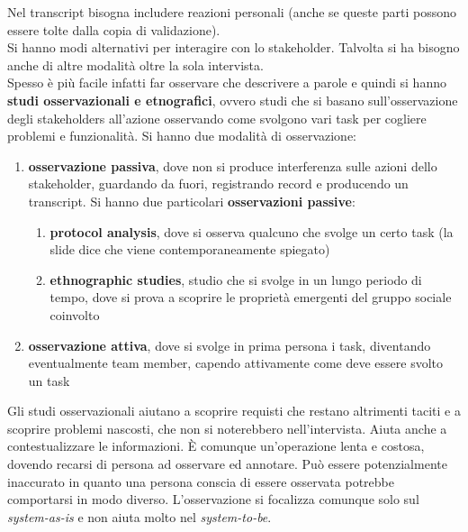 Nel transcript bisogna includere reazioni personali (anche se queste parti possono essere tolte dalla copia di validazione).\\
Si hanno modi alternativi per interagire con lo stakeholder. Talvolta si ha bisogno anche di altre modalità oltre la sola intervista.\\
Spesso è più facile infatti far osservare che descrivere a parole e quindi si hanno \textbf{studi osservazionali e etnografici}, ovvero studi che si basano sull'osservazione degli stakeholders all'azione osservando come svolgono vari task per cogliere problemi e funzionalità. Si hanno due modalità di osservazione:
\begin{enumerate}
  \item \textbf{osservazione passiva}, dove non si produce interferenza sulle azioni dello stakeholder, guardando da fuori, registrando record e producendo un transcript. Si hanno due particolari \textbf{osservazioni passive}:
      \begin{enumerate}
        \item \textbf{protocol analysis}, dove si osserva qualcuno che svolge un certo task (la slide dice che viene contemporaneamente spiegato)
        \item \textbf{ethnographic studies}, studio che si svolge in un lungo periodo di tempo, dove si prova a scoprire le proprietà emergenti del gruppo sociale coinvolto
      \end{enumerate}
  \item \textbf{osservazione attiva}, dove si svolge in prima persona i task, diventando eventualmente team member, capendo attivamente come deve essere svolto un task
\end{enumerate}
Gli studi osservazionali aiutano a scoprire requisti che restano altrimenti taciti e a scoprire problemi nascosti, che non si noterebbero nell'intervista. Aiuta anche a contestualizzare le informazioni. È comunque un'operazione lenta e costosa, dovendo recarsi di persona ad osservare ed annotare. Può essere potenzialmente inaccurato in quanto una persona conscia di essere osservata potrebbe comportarsi in modo diverso. L'osservazione si focalizza comunque solo sul \textit{system-as-is} e non aiuta molto nel \textit{system-to-be}.\\

